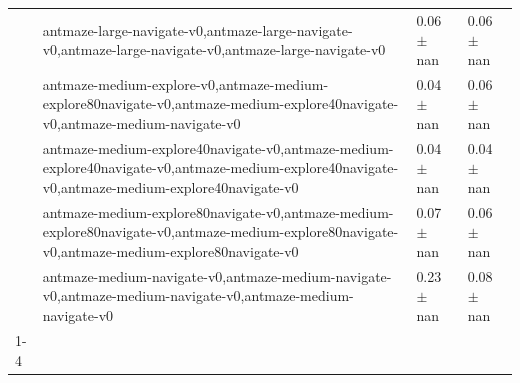 \begin{tabular}{llll}
 & antmaze-large-navigate-v0,antmaze-large-navigate-v0,antmaze-large-navigate-v0,antmaze-large-navigate-v0 & 0.06 $\pm$ nan & 0.06 $\pm$ nan \\
 & antmaze-medium-explore-v0,antmaze-medium-explore80navigate-v0,antmaze-medium-explore40navigate-v0,antmaze-medium-navigate-v0 & 0.04 $\pm$ nan & 0.06 $\pm$ nan \\
 & antmaze-medium-explore40navigate-v0,antmaze-medium-explore40navigate-v0,antmaze-medium-explore40navigate-v0,antmaze-medium-explore40navigate-v0 & 0.04 $\pm$ nan & 0.04 $\pm$ nan \\
 & antmaze-medium-explore80navigate-v0,antmaze-medium-explore80navigate-v0,antmaze-medium-explore80navigate-v0,antmaze-medium-explore80navigate-v0 & 0.07 $\pm$ nan & 0.06 $\pm$ nan \\
 & antmaze-medium-navigate-v0,antmaze-medium-navigate-v0,antmaze-medium-navigate-v0,antmaze-medium-navigate-v0 & 0.23 $\pm$ nan & 0.08 $\pm$ nan \\
\cline{1-4}
\bottomrule
\end{tabular}
